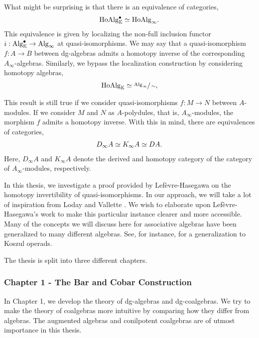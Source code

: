 \documentclass[../thesis.tex]{subfiles}
\begin{document}
        What might be surprising is that there is an equivalence of categories,
        \begin{align*}
            \tt{HoAlg}_\mathbb{K}^\bullet \simeq \tt{HoAlg}_\infty\tt{.}
        \end{align*}
        This equivalence is given by localizing the non-full inclusion functor $i: \tt{Alg}_\mathbb{K}^\bullet \rightarrow \tt{Alg}_\infty$ at quasi-isomorphisms. We may say that a quasi-isomorphism $f: A\rightarrow B$ between dg-algebras admits a homotopy inverse of the corresponding $A_\infty$-algebras. Similarly, we bypass the localization construction by considering homotopy algebras,
        \begin{align*}
            \tt{HoAlg}_\mathbb{K} \simeq \sfrac{\tt{Alg}_\infty}{\sim}\tt{,}
        \end{align*}

        This result is still true if we consider quasi-isomorphisms $f:M\rightarrow N$ between $A$-modules. If we consider $M$ and $N$ as $A$-polydules, that is, $A_\infty$-modules, the morphism $f$ admits a homotopy inverse. With this in mind, there are equivalences of categories,
        \begin{align*}
            D_\infty A \simeq K_\infty A \simeq DA\tt{.}
        \end{align*}
        Here, $D_\infty A$ and $K_\infty A$ denote the derived and homotopy category of the category of $A_\infty$-modules, respectively.

        In this thesis, we investigate a proof provided by Lef\`evre-Hasegawa \cite{LefevreHasegawa03} on the homotopy invertibility of quasi-isomorphisms. In our approach, we will take a lot of inspiration from Loday and Vallette \cite{Loday12}. We wish to elaborate upon Lef\`evre-Hasegawa's work to make this particular instance clearer and more accessible. Many of the concepts we will discuss here for associative algebras have been generalized to many different algebras. See, for instance, \cite{Vallette20} for a generalization to Koszul operads.
        
        The thesis is split into three different chapters.

        \subsubsection*{Chapter 1 - The Bar and Cobar Construction}
            In Chapter 1, we develop the theory of dg-algebras and dg-coalgebras. We try to make the theory of coalgebras more intuitive by comparing how they differ from algebras. The augmented algebras and conilpotent coalgebras are of utmost importance in this thesis.
\end{document}
